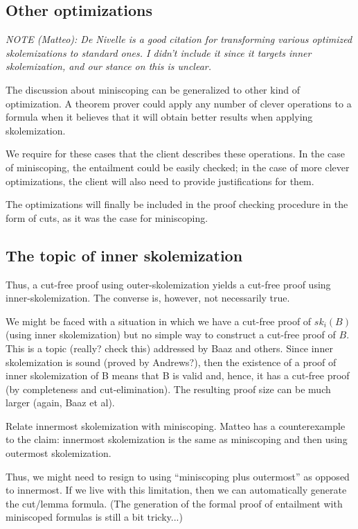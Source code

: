 \documentclass[a4paper,USenglish]{lipics-v2018}
\begin{document}
{\subsection{Other optimizations}

\emph{NOTE (Matteo): De Nivelle \cite{denivelle02csl} is a good
citation for transforming various optimized skolemizations to standard
ones. I didn't include it since it targets inner skolemization, and
our stance on this is unclear.}

The discussion about miniscoping can be generalized to other kind of
optimization. A theorem prover could apply any number of clever
operations to a formula when it believes that it will obtain better
results when applying skolemization.

We require for these cases that the client describes these
operations. In the case of miniscoping, the entailment could be easily
checked; in the case of more clever optimizations, the client will
also need to provide justifications for them.

The optimizations will finally be included in the proof checking
procedure in the form of cuts, as it was the case for miniscoping.

\subsection{The topic of inner skolemization}

Thus, a cut-free proof using outer-skolemization yields a cut-free
proof using inner-skolemization.  The converse is, however, not
necessarily true.

We might be faced with a situation in which we have a cut-free proof
of $sk_i(B)$ (using inner skolemization) but no simple way to
construct a cut-free proof of $B$.  This is a topic (really? check
this) addressed by Baaz and others.  Since inner skolemization is
sound (proved by Andrews?), then the existence of a proof of inner
skolemization of B means that B is valid and, hence, it has a cut-free
proof (by completeness and cut-elimination).  The resulting proof size
can be much larger (again, Baaz et al).

Relate innermost skolemization with miniscoping.  Matteo has a
counterexample to the claim: innermost skolemization is the same as
miniscoping and then using outermost skolemization.

Thus, we might need to resign to using ``miniscoping plus outermost''
as opposed to innermost.  If we live with this limitation, then we can
automatically generate the cut/lemma formula.  (The generation of the
formal proof of entailment with miniscoped formulas is still a bit
tricky...)



}
\end{document}

